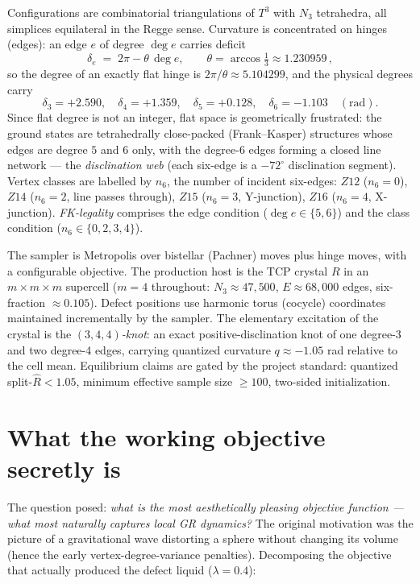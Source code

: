 \documentclass[11pt]{article}
\newcommand{\Nfk}{n_6}
\begin{document}
Configurations are combinatorial triangulations of $T^3$ with $N_3$
tetrahedra, all simplices equilateral in the Regge sense. Curvature is
concentrated on hinges (edges): an edge $e$ of degree $\deg e$ carries deficit
\begin{equation}
\delta_e \;=\; 2\pi - \theta\,\deg e,
\qquad
\theta = \arccos\tfrac13 \approx 1.230959\,,
\label{eq:deficit}
\end{equation}
so the degree of an exactly flat hinge is $2\pi/\theta \approx 5.104299$,
and the physical degrees carry
\[
\delta_3 = +2.590,\quad
\delta_4 = +1.359,\quad
\delta_5 = +0.128,\quad
\delta_6 = -1.103 \quad (\mathrm{rad}).
\]
Since flat degree is not an integer, flat space is geometrically frustrated:
the ground states are tetrahedrally close-packed (Frank--Kasper) structures
\cite{frank-kasper,nelson,sadoc-mosseri} whose edges are degree $5$ and $6$
only, with the degree-6 edges forming a closed line network --- the
\emph{disclination web} (each six-edge is a $-72^\circ$ disclination
segment). Vertex classes are labelled by $\Nfk$, the number of incident
six-edges: $Z12$ ($\Nfk=0$), $Z14$ ($\Nfk=2$, line passes through), $Z15$
($\Nfk=3$, Y-junction), $Z16$ ($\Nfk=4$, X-junction). \emph{FK-legality}
comprises the edge condition ($\deg e \in \{5,6\}$) and the class condition
($\Nfk \in \{0,2,3,4\}$).

The sampler is Metropolis over bistellar (Pachner) moves plus hinge moves,
with a configurable objective. The production host is the TCP crystal $R$
in an $m\times m\times m$ supercell ($m=4$ throughout: $N_3 \approx 47{,}500$,
$E \approx 68{,}000$ edges, six-fraction $\approx 0.105$). Defect positions
use harmonic torus (cocycle) coordinates maintained incrementally by the
sampler. The elementary excitation of the crystal is the
\emph{$(3,4,4)$-knot}: an exact positive-disclination knot of one
degree-3 and two degree-4 edges, carrying quantized curvature
$q \approx -1.05$ rad relative to the cell mean. Equilibrium claims are
gated by the project standard: quantized split-$\hat R < 1.05$, minimum
effective sample size $\geq 100$, two-sided initialization.

\section{What the working objective secretly is}
\label{sec:decomposition}

The question posed: \emph{what is the most aesthetically pleasing objective
function --- what most naturally captures local GR dynamics?} The original
motivation was the picture of a gravitational wave distorting a sphere
without changing its volume (hence the early vertex-degree-variance
penalties). Decomposing the objective that actually produced the defect
liquid ($\lambda = 0.4$):
\end{document}
